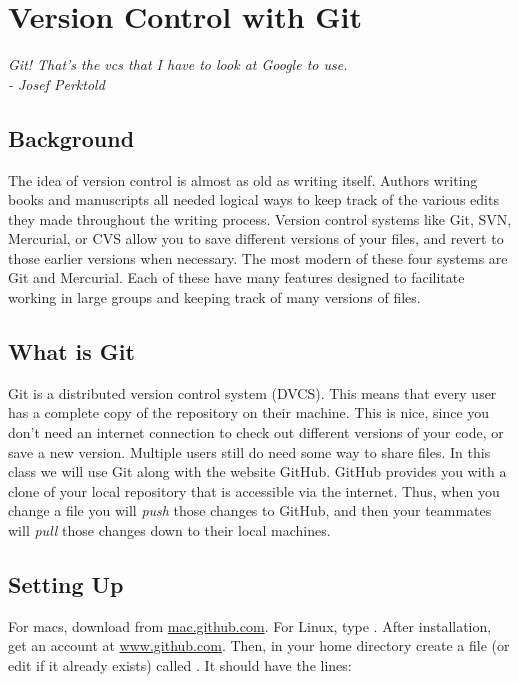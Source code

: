 \chapter{Version Control with Git}
\label{chapter:git}
\begin{center}
{\Large\textit{Git!  That's the vcs that I have to look at Google to use.\\- Josef Perktold}}
\end{center}
\vspace{0.2in}

\section{Background}
\label{git:whatis_vcs}

The idea of version control is almost as old as writing itself. Authors writing books and manuscripts all needed logical ways to keep track of the various edits they made throughout the writing process.  Version control systems like Git, SVN, Mercurial, or CVS allow you to save different versions of your files, and revert to those earlier versions when necessary.  The most modern of these four systems are Git and Mercurial.  Each of these have many features designed to facilitate working in large groups and keeping track of many versions of files.

\section{What is Git}
\label{git:whatis_git}

Git is a distributed version control system (DVCS). This means that every user has a complete copy of the repository on their machine.  This is nice, since you don't need an internet connection to check out different versions of your code, or save a new version.  Multiple users still do need some way to share files.  In this class we will use Git along with the website GitHub.  GitHub provides you with a clone of your local repository that is accessible via the internet.  Thus, when you change a file you will \emph{push} those changes to GitHub, and then your teammates will \emph{pull} those changes down to their local machines.

\section{Setting Up}
\label{git:setting_up}
For macs, download from \url{mac.github.com}.  For Linux, type .  After installation, get an account at \url{www.github.com}.  Then, in your home directory create a file (or edit if it already exists) called .  It should have the lines:


